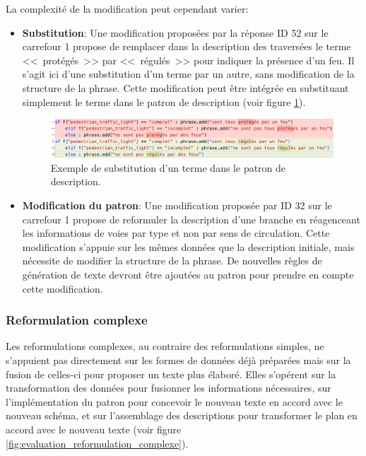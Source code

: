 \begin{samepage}
La complexité de la modification peut cependant varier:
\begin{itemize}
    \item \textbf{Substitution}: Une modification proposées par la réponse ID 52 sur le carrefour 1 propose de remplacer dans la description des traversées le terme <<~protégés~>> par <<~régulés~>> pour indiquer la présence d'un feu. Il s'agit ici d'une substitution d'un terme par un autre, sans modification de la structure de la phrase. Cette modification peut être intégrée en substituant simplement le terme dans le patron de description (voir figure \ref{fig:evaluation_reformulation_simple_substitution}).
    \begin{figure}[ht]
        \centering
        \includegraphics[width=\textwidth]{images/evaluation/pipeline/substitution.png}
        \caption[Exemple de substitution]{Exemple de substitution d'un terme dans le patron de description.}
        \label{fig:evaluation_reformulation_simple_substitution}
    \end{figure}
    \item \textbf{Modification du patron}: Une modification proposée par ID 32 sur le carrefour 1 propose de reformuler la description d'une branche en réagenceant les informations de voies par type et non par sens de circulation. Cette modification s'appuie sur les mêmes données que la description initiale, mais nécessite de modifier la structure de la phrase. De nouvelles règles de génération de texte devront être ajoutées au patron pour prendre en compte cette modification.
\end{itemize}
\end{samepage}

\subsubsection{Reformulation complexe}

Les reformulations complexes, au contraire des reformulations simples, ne s'appuient pas directement sur les formes de données déjà préparées mais sur la fusion de celles-ci pour proposer un texte plus élaboré. Elles s'opérent sur la transformation des données pour fusionner les informations nécessaires, sur l'implémentation du patron pour concevoir le nouveau texte en accord avec le nouveau schéma, et sur l'assemblage des descriptions pour transformer le plan en accord avec le nouveau texte (voir figure \ref{fig:evaluation_reformulation_complexe}).

